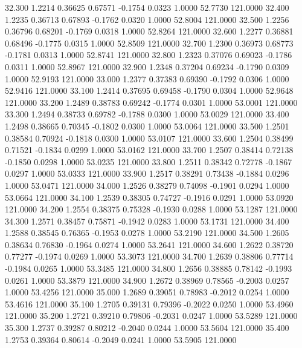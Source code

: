   32.300   1.2214   0.36625   0.67571  -0.1754   0.0323   1.0000  52.7730 121.0000
  32.400   1.2235   0.36713   0.67893  -0.1762   0.0320   1.0000  52.8004 121.0000
  32.500   1.2256   0.36796   0.68201  -0.1769   0.0318   1.0000  52.8264 121.0000
  32.600   1.2277   0.36881   0.68496  -0.1775   0.0315   1.0000  52.8509 121.0000
  32.700   1.2300   0.36973   0.68773  -0.1781   0.0313   1.0000  52.8741 121.0000
  32.800   1.2323   0.37076   0.69023  -0.1786   0.0311   1.0000  52.8967 121.0000
  32.900   1.2348   0.37204   0.69234  -0.1790   0.0309   1.0000  52.9193 121.0000
  33.000   1.2377   0.37383   0.69390  -0.1792   0.0306   1.0000  52.9416 121.0000
  33.100   1.2414   0.37695   0.69458  -0.1790   0.0304   1.0000  52.9648 121.0000
  33.200   1.2489   0.38783   0.69242  -0.1774   0.0301   1.0000  53.0001 121.0000
  33.300   1.2494   0.38733   0.69782  -0.1788   0.0300   1.0000  53.0029 121.0000
  33.400   1.2498   0.38665   0.70345  -0.1802   0.0300   1.0000  53.0064 121.0000
  33.500   1.2501   0.38584   0.70924  -0.1818   0.0300   1.0000  53.0107 121.0000
  33.600   1.2504   0.38499   0.71521  -0.1834   0.0299   1.0000  53.0162 121.0000
  33.700   1.2507   0.38414   0.72138  -0.1850   0.0298   1.0000  53.0235 121.0000
  33.800   1.2511   0.38342   0.72778  -0.1867   0.0297   1.0000  53.0333 121.0000
  33.900   1.2517   0.38291   0.73438  -0.1884   0.0296   1.0000  53.0471 121.0000
  34.000   1.2526   0.38279   0.74098  -0.1901   0.0294   1.0000  53.0664 121.0000
  34.100   1.2539   0.38305   0.74727  -0.1916   0.0291   1.0000  53.0920 121.0000
  34.200   1.2554   0.38375   0.75328  -0.1930   0.0288   1.0000  53.1287 121.0000
  34.300   1.2571   0.38457   0.75871  -0.1942   0.0283   1.0000  53.1731 121.0000
  34.400   1.2588   0.38545   0.76365  -0.1953   0.0278   1.0000  53.2190 121.0000
  34.500   1.2605   0.38634   0.76830  -0.1964   0.0274   1.0000  53.2641 121.0000
  34.600   1.2622   0.38720   0.77277  -0.1974   0.0269   1.0000  53.3073 121.0000
  34.700   1.2639   0.38806   0.77714  -0.1984   0.0265   1.0000  53.3485 121.0000
  34.800   1.2656   0.38885   0.78142  -0.1993   0.0261   1.0000  53.3879 121.0000
  34.900   1.2672   0.38969   0.78565  -0.2003   0.0257   1.0000  53.4256 121.0000
  35.000   1.2689   0.39051   0.78983  -0.2012   0.0254   1.0000  53.4616 121.0000
  35.100   1.2705   0.39131   0.79396  -0.2022   0.0250   1.0000  53.4960 121.0000
  35.200   1.2721   0.39210   0.79806  -0.2031   0.0247   1.0000  53.5289 121.0000
  35.300   1.2737   0.39287   0.80212  -0.2040   0.0244   1.0000  53.5604 121.0000
  35.400   1.2753   0.39364   0.80614  -0.2049   0.0241   1.0000  53.5905 121.0000
